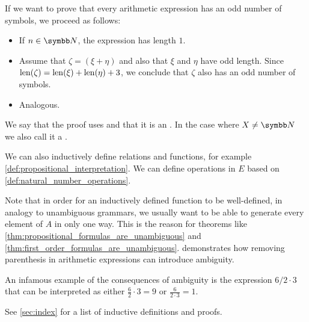 \begin{remark}
  If we want to prove that every arithmetic expression has an odd number of symbols, we proceed as follows:
  \begin{itemize}
    \item If \( n \in \N \), the expression has length \( 1 \).
    \item Assume that \( \zeta = (\xi + \eta) \) and also that \( \xi \) and \( \eta \) have odd length. Since \( \operatorname{len}(\zeta) = \operatorname{len}(\xi) + \operatorname{len}(\eta) + 3 \), we conclude that \( \zeta \) also has an odd number of symbols.
    \item Analogous.
  \end{itemize}

  We say that the proof uses  and that it is an . In the case where \( X \neq \N \) we also call it a .

  We can also inductively define relations and functions, for example \cref{def:propositional_interpretation}. We can define operations in \( E \) based on \cref{def:natural_number_operations}.

  Note that in order for an inductively defined function to be well-defined, in analogy to unambiguous grammars, we usually want to be able to generate every element of \( A \) in only one way. This is the reason for theorems like \cref{thm:propositional_formulas_are_unambiguous} and \cref{thm:first_order_formulas_are_unambiguous}.  demonstrates how removing parenthesis in arithmetic expressions can introduce ambiguity.

  An infamous example of the consequences of ambiguity is the expression \( 6 / 2 \cdot 3 \) that can be interpreted as either \( \tfrac 6 2 \cdot 3 = 9 \) or \( \tfrac 6 {2 \cdot 3} = 1 \).

  See \cref{sec:index} for a list of inductive definitions and proofs.
\end{remark}
